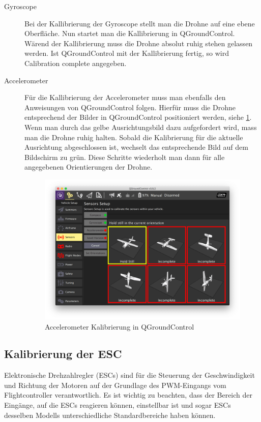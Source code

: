 \begin{description}
    \item[Gyroscope] Bei der Kallibrierung der Gyroscope stellt man die Drohne auf eine ebene Oberfläche. Nun startet man die Kallibrierung in QGroundControl. Wärend der Kallibrierung muss die Drohne absolut ruhig stehen gelassen werden. Ist QGroundControl mit der Kallibrierung fertig, so wird Calibration complete angegeben.
    
    \item[Accelerometer] Für die Kallibrierung der Accelerometer muss man ebenfalls den Anweisungen von QGroundControl folgen. Hierfür muss die Drohne entsprechend der Bilder in QGroundControl positioniert werden, siehe \ref{fig:accel-calibration}. Wenn man durch das gelbe Ausrichtungsbild dazu aufgefordert wird, mass man die Drohne ruhig halten. Sobald die Kalibrierung für die aktuelle Ausrichtung abgeschlossen ist, wechselt das entsprechende Bild auf dem Bildschirm zu grün. Diese Schritte wiederholt man dann für alle angegebenen Orientierungen der Drohne.
    \begin{figure}[H]
        \includegraphics[width=\textwidth]{./images/qgc-cal-accelerometer.png}
        \caption{Accelerometer Kalibrierung in QGroundControl}\label{fig:accel-calibration}
    \end{figure}

\end{description}



\subsection{Kalibrierung der ESC}
Elektronische Drehzahlregler (ESCs) sind für die Steuerung der Geschwindigkeit und Richtung der Motoren auf der Grundlage des PWM-Eingangs vom Flightcontroller verantwortlich. Es ist wichtig zu beachten, dass der Bereich der Eingänge, auf die ESCs reagieren können, einstellbar ist und sogar ESCs desselben Modells unterschiedliche Standardbereiche haben können.


